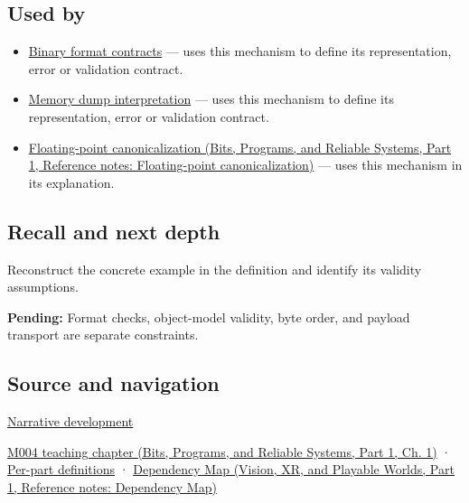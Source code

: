 \subsection{Used by}\label{appendix-34ee45f161c1-used-by}

\hypertarget{appendix-34ee45f161c1-used-by}{}

\begin{itemize}
\item
  \hyperref[appendix-590bbb2424c1]{Binary format contracts} --- uses this mechanism to define its representation, error or validation contract.
\item
  \hyperref[appendix-230b59c0676b]{Memory dump interpretation} --- uses this mechanism to define its representation, error or validation contract.
\item
  \href{../01-Bits-Programs-and-Reliable-Systems-P01/main.pdf\#appendix-e90053a4b201}{Floating-point canonicalization (Bits, Programs, and Reliable Systems, Part 1, Reference notes: Floating-point canonicalization)} --- uses this mechanism in its explanation.
\end{itemize}

\subsection{Recall and next depth}\label{appendix-34ee45f161c1-recall-and-next-depth}

\hypertarget{appendix-34ee45f161c1-recall-and-next-depth}{}

Reconstruct the concrete example in the definition and identify its validity assumptions.

\textbf{Pending:} Format checks, object-model validity, byte order, and payload transport are separate constraints.

\subsection{Source and navigation}\label{appendix-34ee45f161c1-source-and-navigation}

\hypertarget{appendix-34ee45f161c1-source-and-navigation}{}

\hyperref[01-foundations-i-ch002-bytes-become-a-durable-agreement]{Narrative development}

\href{../01-Bits-Programs-and-Reliable-Systems-P01/main.pdf\#01-foundations-i-ch001-a-stretching-ruler-for-real-valued-quantities}{M004 teaching chapter (Bits, Programs, and Reliable Systems, Part 1, Ch. 1)} · \hyperref[appendix-fd090d982a15-m004---parts-61-76]{Per-part definitions} · \href{../07-Vision-XR-and-Playable-Worlds-P01/main.pdf\#appendix-4ad47bdd269a}{Dependency Map (Vision, XR, and Playable Worlds, Part 1, Reference notes: Dependency Map)}
